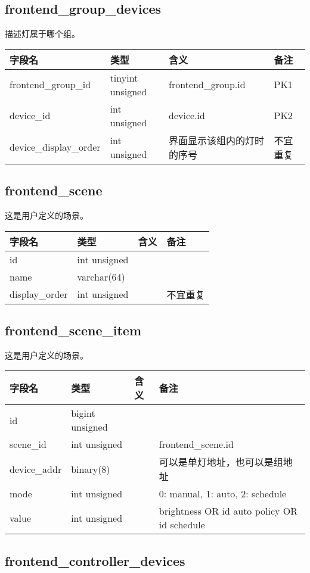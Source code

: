 \subsection{frontend\_group\_devices}\label{frontendux5fgroupux5fdevices}

描述灯属于哪个组。

\begin{longtabu}[c]{@{}lXXX@{}}
\toprule
字段名 & 类型 & 含义 & 备注\tabularnewline
\midrule
\endhead
frontend\_group\_id & tinyint unsigned & frontend\_group.id &
PK1\tabularnewline
device\_id & int unsigned & device.id & PK2\tabularnewline
device\_display\_order & int unsigned & 界面显示该组内的灯时的序号 &
不宜重复\tabularnewline
\bottomrule
\end{longtabu}

\subsection{frontend\_scene}\label{frontendux5fscene}

这是用户定义的场景。

\begin{longtabu}[c]{@{}lXXX@{}}
\toprule
字段名 & 类型 & 含义 & 备注\tabularnewline
\midrule
\endhead
id & int unsigned & &\tabularnewline
name & varchar(64) & &\tabularnewline
display\_order & int unsigned & & 不宜重复\tabularnewline
\bottomrule
\end{longtabu}

\subsection{frontend\_scene\_item}\label{frontendux5fsceneux5fitem}

这是用户定义的场景。

\begin{longtabu}[c]{@{}lXXX@{}}
\toprule
字段名 & 类型 & 含义 & 备注\tabularnewline
\midrule
\endhead
id & bigint unsigned & &\tabularnewline
scene\_id & int unsigned & & frontend\_scene.id\tabularnewline
device\_addr & binary(8) & &
可以是单灯地址，也可以是组地址\tabularnewline
mode & int unsigned & & 0: manual, 1: auto, 2: schedule\tabularnewline
value & int unsigned & & brightness OR id auto policy OR id
schedule\tabularnewline
\bottomrule
\end{longtabu}

\subsection{frontend\_controller\_devices}\label{frontendux5fcontrollerux5fdevices}

